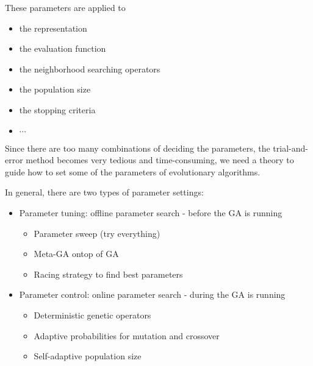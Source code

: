         These parameters are applied to

        \begin{itemize}
            \item the representation
            \item the evaluation function
            \item the neighborhood searching operators
            \item the population size
            \item the stopping criteria
            \item $\cdots$
        \end{itemize}

        Since there are too many combinations of deciding the parameters, the trial-and-error method becomes very tedious and time-consuming, we need a theory to guide how to set some of the parameters of evolutionary algorithms.

        In general, there are two types of parameter settings:

        \begin{itemize}
            \item Parameter tuning: offline parameter search - before the GA is running
            \begin{itemize}
                \item Parameter sweep (try everything)
                \item Meta-GA ontop of GA
                \item Racing strategy to find best parameters
            \end{itemize}
            \item Parameter control: online parameter search - during the GA is running
            \begin{itemize}
                \item Deterministic genetic operators
                \item Adaptive probabilities for mutation and crossover
                \item Self-adaptive population size
            \end{itemize}
        \end{itemize}

